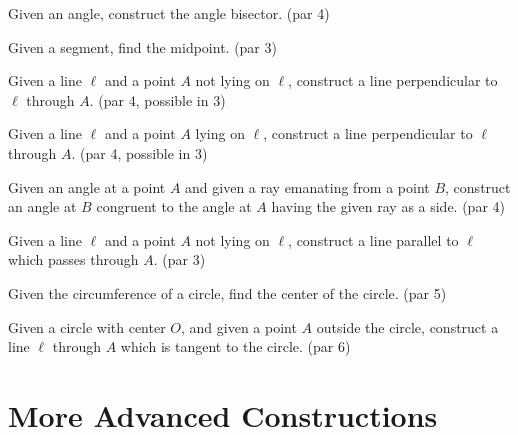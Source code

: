 \begin{challenge}\label{chal:angle-bisector}
Given an angle, construct the angle bisector. (par 4)
\end{challenge}

\begin{challenge}\label{chal:midpoint}
Given a segment, find the midpoint. (par 3)
\end{challenge}

\begin{challenge}\label{chal:perp-pt-not-on-line}
Given a line $\ell$ and a point $A$ not lying on $\ell$, construct a line perpendicular to $\ell$ through $A$. (par 4, possible in 3)
\end{challenge}

\begin{challenge}\label{chal:perp-pt-on-line}
Given a line $\ell$ and a point $A$ lying on $\ell$, construct a line perpendicular to $\ell$ through $A$. (par 4, possible in 3)
\end{challenge}

\begin{challenge}\label{chal:copy-angle}
Given an angle at a point $A$ and given a ray emanating from a point $B$, construct an angle at $B$ congruent to the angle at $A$ having the given ray as a side. (par 4)
\end{challenge}

\begin{challenge}\label{chal:parallel}
Given a line $\ell$ and a point $A$ not lying on $\ell$, construct a line parallel to $\ell$ which passes through $A$. (par 3)
\end{challenge}

\begin{challenge}\label{chal:circle-center}
Given the circumference of a circle, find the center of the circle. (par 5)
\end{challenge}

\begin{challenge}\label{chal:tangent-circle-point}
Given a circle with center $O$, and given a point $A$ outside the circle, construct a line $\ell$ through $A$ which is tangent to the circle. (par 6)
\end{challenge}



\chapter{More Advanced Constructions}


